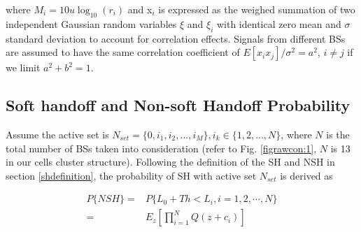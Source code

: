 \noindent where $M_i = 10u\log _{10} (r_i )$ and x$_{i }$ is
expressed as the weighed summation of two independent Gaussian
random variables $\xi$ and $\xi_i$ with identical zero mean and
$\sigma$ standard deviation to account for correlation effects.
Signals from different BSs are assumed to have the same
correlation coefficient of $E[x_i x_j ] / \sigma ^2 = a^2$, $i \ne
j$ if we limit $a^2 + b^2 = 1$.

\subsection{Soft handoff and Non-soft Handoff Probability}
\label{sec:sh} Assume the active set is
$N_{set}=\{0,i_{1},i_{2},...,i_{M}\}, i_{k}\in \{1,2,\ldots ,N\}$,
where $N$ is the total number of BSs taken into consideration
(refer to Fig. \ref{figrawcon:1}, $N$ is 13 in our cells cluster
structure). Following the definition of the SH and NSH in section
\ref{shdefinition}, the probability of SH with active set
$N_{set}$ is derived as

\begin{equation}
\label{eqrawcon:3}\begin{split}
P\{NSH\}=&P\{L_0 + Th < L_i,i=1,2,\cdots,N\} \\
=& E_z[\prod\limits_{i = 1}^{N} Q(z + c_i )]
\end{split}
\end{equation}
















